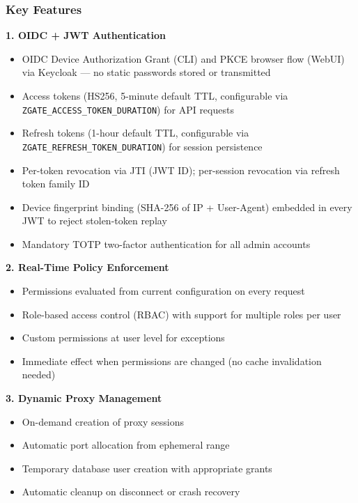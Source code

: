 \subsubsection{Key Features}

\textbf{1. OIDC + JWT Authentication}
\begin{itemize}
    \item OIDC Device Authorization Grant (CLI) and PKCE browser flow (WebUI) via Keycloak — no static passwords stored or transmitted
    \item Access tokens (HS256, 5-minute default TTL, configurable via \texttt{ZGATE\_ACCESS\_TOKEN\_DURATION}) for API requests
    \item Refresh tokens (1-hour default TTL, configurable via \texttt{ZGATE\_REFRESH\_TOKEN\_DURATION}) for session persistence
    \item Per-token revocation via JTI (JWT ID); per-session revocation via refresh token family ID
    \item Device fingerprint binding (SHA-256 of IP + User-Agent) embedded in every JWT to reject stolen-token replay
    \item Mandatory TOTP two-factor authentication for all admin accounts
\end{itemize}

\textbf{2. Real-Time Policy Enforcement}
\begin{itemize}
    \item Permissions evaluated from current configuration on every request
    \item Role-based access control (RBAC) with support for multiple roles per user
    \item Custom permissions at user level for exceptions
    \item Immediate effect when permissions are changed (no cache invalidation needed)
\end{itemize}

\textbf{3. Dynamic Proxy Management}
\begin{itemize}
    \item On-demand creation of proxy sessions
    \item Automatic port allocation from ephemeral range
    \item Temporary database user creation with appropriate grants
    \item Automatic cleanup on disconnect or crash recovery
\end{itemize}

